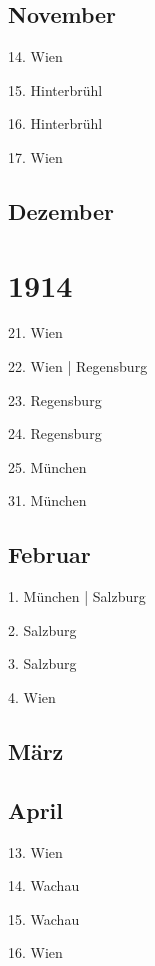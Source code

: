 \documentclass[twoside=false,titlepage=false,open=any, parskip=never, fontsize=10pt, headings=small, chapterprefix=false, appendixprefix=false, DIV=15]{scrbook}
\begin{document}
\begin{multicols}{3}
            \section*{November}
            14. Wien\par
            15. Hinterbrühl\par
            16. Hinterbrühl\par
            17. Wien\par
            \section*{Dezember}
            \chapter*{1914}
            21. Wien\par
            22. Wien | Regensburg\par
            23. Regensburg\par
            24. Regensburg\par
            25. München\par
            31. München\par
            \section*{Februar}
            1. München | Salzburg\par
            2. Salzburg\par
            3. Salzburg\par
            4. Wien\par
            \section*{März}
            \section*{April}
            13. Wien\par
            14. Wachau\par
            15. Wachau\par
            16. Wien\par

\end{multicols}
\end{document}
